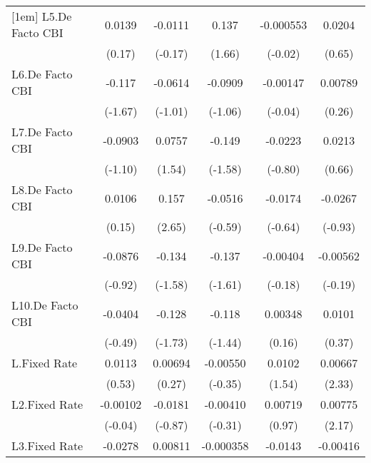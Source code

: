 {\begin{longtable}{l*{5}{c}}
[1em]
L5.De Facto CBI &   0.0139         &  -0.0111         &    0.137         &-0.000553         &   0.0204         \\
                &   (0.17)         &  (-0.17)         &   (1.66)         &  (-0.02)         &   (0.65)         \\
[1em]
L6.De Facto CBI &   -0.117         &  -0.0614         &  -0.0909         & -0.00147         &  0.00789         \\
                &  (-1.67)         &  (-1.01)         &  (-1.06)         &  (-0.04)         &   (0.26)         \\
[1em]
L7.De Facto CBI &  -0.0903         &   0.0757         &   -0.149         &  -0.0223         &   0.0213         \\
                &  (-1.10)         &   (1.54)         &  (-1.58)         &  (-0.80)         &   (0.66)         \\
[1em]
L8.De Facto CBI &   0.0106         &    0.157\sym{**} &  -0.0516         &  -0.0174         &  -0.0267         \\
                &   (0.15)         &   (2.65)         &  (-0.59)         &  (-0.64)         &  (-0.93)         \\
[1em]
L9.De Facto CBI &  -0.0876         &   -0.134         &   -0.137         & -0.00404         & -0.00562         \\
                &  (-0.92)         &  (-1.58)         &  (-1.61)         &  (-0.18)         &  (-0.19)         \\
[1em]
L10.De Facto CBI&  -0.0404         &   -0.128         &   -0.118         &  0.00348         &   0.0101         \\
                &  (-0.49)         &  (-1.73)         &  (-1.44)         &   (0.16)         &   (0.37)         \\
[1em]
L.Fixed Rate    &   0.0113         &  0.00694         & -0.00550         &   0.0102         &  0.00667\sym{*}  \\
                &   (0.53)         &   (0.27)         &  (-0.35)         &   (1.54)         &   (2.33)         \\
[1em]
L2.Fixed Rate   & -0.00102         &  -0.0181         & -0.00410         &  0.00719         &  0.00775\sym{*}  \\
                &  (-0.04)         &  (-0.87)         &  (-0.31)         &   (0.97)         &   (2.17)         \\
[1em]
L3.Fixed Rate   &  -0.0278         &  0.00811         &-0.000358         &  -0.0143         & -0.00416         \\

\end{longtable}}
